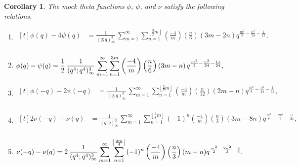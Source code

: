 \documentclass[11pt,reqno]{amsart}
\newtheorem{lcor}[lthm]{Corollary}
\renewcommand{\=}{\;=\;}
\theoremstyle{myremark}
\begin{document}
\begin{lcor} \label{cor:alt_main}
The mock theta functions $\phi$, $\psi$, and $\nu$ satisfy the following relations.

\begin{enumerate}[label=\alph*., ref=\alph*, itemsep=1em]
\renewcommand{\labelenumi}{\textup{\alph{enumi}.}}
\item $\displaystyle
\begin{aligned}[t]
\phi(q) - 4\psi(q) &= \frac{1}{(q;q)^3_\infty}\,\sum_{m=1}^\infty\sum_{n=1}^{\left\lfloor \frac{3}{2}m \right\rfloor}\left(\frac{-4}{m}\right)\left(\frac{n}{6}\right)\left(3m-2n\right)q^{\frac{m^2}{8}-\frac{n^2}{24}-\frac{1}{12}}, \label{eqn:Ba} \\
\end{aligned}
$

\item $\displaystyle
\begin{aligned}[t]
\phi(q)-\psi(q)
&=
\frac{1}{2}\,
{1 \over (q^4;q^4)_\infty^3}\sum_{m=1}^\infty\sum_{n=1}^{3m}
\left(\frac{-4}{m}\right)\left(\frac{n}{6}\right)\left(3m-n\right)
q^{\frac{m^2}{2}-\frac{n^2}{24}-\frac{11}{24}}, \label{eqn:Bb} \\
\end{aligned}
$

\item $\displaystyle
\begin{aligned}[t]
\phi(-q) - 2\psi(-q) &= \frac{1}{(q;q)^3_\infty}\,\sum_{m=1}^\infty\sum_{n=1}^{\left\lfloor \frac{3}{2}m \right\rfloor}\left(\frac{-4}{m}\right)\left(\frac{n}{12}\right)\left(2m-n\right)q^{\frac{m^2}{8}-\frac{n^2}{24}-\frac{1}{12}}, \label{eqn:Bc} \\
\end{aligned}
$

\item $\displaystyle
\begin{aligned}[t]
2\nu(-q) - \nu(q) &= \frac{1}{(q;q)^3_\infty}\sum_{m=1}^\infty\sum_{n=1}^{\left\lfloor \frac{3}{8}m \right\rfloor} (-1)^n \left(\frac{-4}{m}\right)\left(\frac{n}{3}\right)\left(3m-8n\right)q^{\frac{m^2}{8}-\frac{2n^2}{3}-\frac{11}{24}}, \label{eqn:Bd} \\
\end{aligned}
$

\item $\displaystyle
\begin{aligned}[t]
\nu(-q)-\nu(q) &= 2\,{1 \over (q^4;q^4)_\infty^3}\sum_{m=1}^\infty
\sum_{n=1}^{\left\lfloor \frac{3m}{4} \right\rfloor}
(-1)^{n}
\left(\frac{-4}{m}\right)
\left(\frac{n}{3}\right)
(m-n)
q^{\frac{m^2}{2}-\frac{2n^2}{3}-\frac{5}{6}}. \label{eqn:Be}
\end{aligned}
$

\end{enumerate}
\end{lcor}
\end{document}

